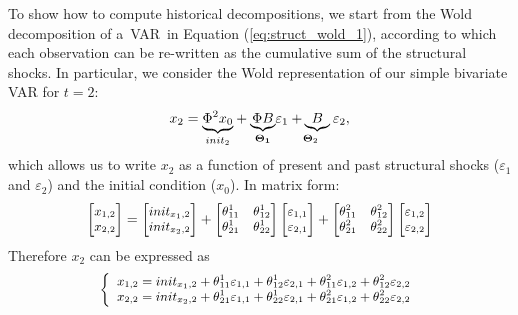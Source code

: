 \documentclass[10pt]{article}
\begin{document}
To show how to compute historical decompositions, we start from the Wold
decomposition of a\ VAR\ in Equation (\ref{eq:struct_wold_1}), according to
which each observation can be re-written as the cumulative sum of the
structural shocks. In particular, we consider the Wold representation of our
simple bivariate VAR for $t=2$:%
\begin{equation*}
x_{2}=\underset{init_{2}}{\underbrace{\Phi ^{2}x_{0}}}+\underset{\boldsymbol{%
\Theta }_{\boldsymbol{1}}}{\underbrace{\Phi B}}\varepsilon _{1}\underset{%
\boldsymbol{\Theta }_{2}}{+\underbrace{B}}\varepsilon _{2},
\end{equation*}%
which allows us to write $x_{2}$ as a function of present and past
structural shocks ($\varepsilon _{1}$ and $\varepsilon _{2}$) and the
initial condition ($x_{0}$). In matrix form:%
\begin{equation*}
{\small 
\begin{bmatrix}
x_{1,2} \\ 
x_{2,2}%
\end{bmatrix}%
=%
\begin{bmatrix}
init_{x_{1},2} \\ 
init_{x_{2},2}%
\end{bmatrix}%
+%
\begin{bmatrix}
\theta _{11}^{1} & \theta _{12}^{1} \\ 
\theta _{21}^{1} & \theta _{22}^{1}%
\end{bmatrix}%
\begin{bmatrix}
\varepsilon _{1,1} \\ 
\varepsilon _{2,1}%
\end{bmatrix}%
+%
\begin{bmatrix}
\theta _{11}^{2} & \theta _{12}^{2} \\ 
\theta _{21}^{2} & \theta _{22}^{2}%
\end{bmatrix}%
\begin{bmatrix}
\varepsilon _{1,2} \\ 
\varepsilon _{2,2}%
\end{bmatrix}%
}
\end{equation*}%
Therefore $x_{2}$ can be expressed as 
\begin{equation*}
{\small \left\{ 
\begin{array}{l}
x_{1,2}=init_{x_{1},2}+\theta _{11}^{1}\varepsilon _{1,1}+\theta
_{12}^{1}\varepsilon _{2,1}+\theta _{11}^{2}\varepsilon _{1,2}+\theta
_{12}^{2}\varepsilon _{2,2} \\ 
x_{2,2}=init_{x_{2},2}+\theta _{21}^{1}\varepsilon _{1,1}+\theta
_{22}^{1}\varepsilon _{2,1}+\theta _{21}^{2}\varepsilon _{1,2}+\theta
_{22}^{2}\varepsilon _{2,2}%
\end{array}%
\right. }
\end{equation*}%
\end{document}
